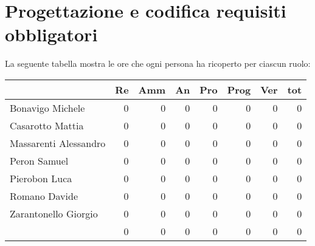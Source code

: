 \section{Progettazione e codifica requisiti obbligatori}

La seguente tabella mostra le ore che ogni persona ha ricoperto per ciascun ruolo:

\begin{table}[ht]
    \begin{tabularx}{\linewidth}{X|rrrrrrr}
    \rowcolor{gray!30}& Re & Amm & An & Pro & Prog & Ver & tot \\
    \hline
    Bonavigo Michele                        & 0 & 0 & 0 & 0 & 0 & 0 & 0 \\
    \rowcolor{gray!10}Casarotto Mattia      & 0 & 0 & 0 & 0 & 0 & 0 & 0 \\
    Massarenti Alessandro                   & 0 & 0 & 0 & 0 & 0 & 0 & 0 \\
    \rowcolor{gray!10}Peron Samuel          & 0 & 0 & 0 & 0 & 0 & 0 & 0 \\
    Pierobon Luca                           & 0 & 0 & 0 & 0 & 0 & 0 & 0 \\
    \rowcolor{gray!10}Romano Davide         & 0 & 0 & 0 & 0 & 0 & 0 & 0 \\
    Zarantonello Giorgio                    & 0 & 0 & 0 & 0 & 0 & 0 & 0 \\
    \hline                                  & 0 & 0 & 0 & 0 & 0 & 0 & 0 \\ 
    \end{tabularx}
\end{table}